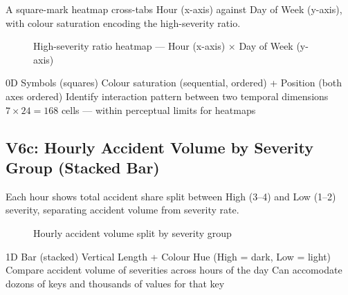 A square-mark heatmap cross-tabs Hour (x-axis) against Day of Week (y-axis),
with colour saturation encoding the high-severity ratio.

\begin{figure}[H]
  \centering
  \caption{High-severity ratio heatmap --- Hour (x-axis) $\times$ Day of Week (y-axis)}
  \label{fig:v6b}
\end{figure}

\idiomtable
  {0D Symbols (squares)}
  {Colour saturation (sequential, ordered) + Position (both axes ordered)}
  {Identify interaction pattern between two temporal dimensions}
  {$7 \times 24 = 168$ cells --- within perceptual limits for heatmaps}


\subsection{V6c: Hourly Accident Volume by Severity Group (Stacked Bar)}

Each hour shows total accident share split between High (3--4) and Low (1--2)
severity, separating accident volume from severity rate.

\begin{figure}[H]
  \centering
  \caption{Hourly accident volume split by severity group}
  \label{fig:v6c}
\end{figure}

\idiomtable
  {1D Bar (stacked)}
  {Vertical Length + Colour Hue (High = dark, Low = light)}
  {Compare accident volume of severities across hours of the day}
  {Can accomodate dozons of keys and thousands of values for that key}
  
